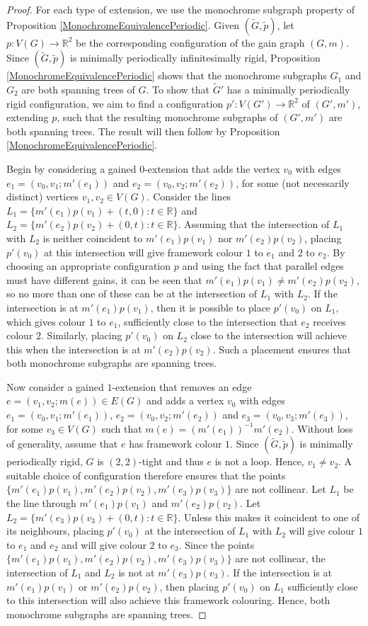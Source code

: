 \documentclass[reqno,a4paper,10pt]{article}
\theoremstyle{definition}
\theoremstyle{remark}
\numberwithin{equation}{section}
\numberwithin{figure}{section}
\numberwithin{table}{section}
\newcommand{\R}{\mathbb{R}}
\newcommand{\G}{\tilde{G}}
\newcommand{\p}{\tilde{p}}
\begin{document}
	\begin{proof}
        For each type of extension, we use the monochrome subgraph property of Proposition \ref{MonochromeEquivalencePeriodic}. Given $(\G,\p)$, let $p:V(G)\to\R^2$ be the corresponding configuration of the gain graph $(G,m)$. Since $(\G,\p)$ is minimally periodically infinitesimally rigid, Proposition \ref{MonochromeEquivalencePeriodic} shows that the monochrome subgraphs $G_1$ and $G_2$ are both spanning trees of $G$. To show that $\G'$ has a minimally periodically rigid configuration, we aim to find a configuration $p':V(G')\to\R^2$ of $(G',m')$, extending $p$, such that the resulting monochrome subgraphs of $(G',m')$ are both spanning trees. The result will then follow by Proposition \ref{MonochromeEquivalencePeriodic}.
    
		Begin by considering a gained $0$-extension that adds the vertex $v_0$ with edges $e_1=(v_0,v_1;m'(e_1))$ and $e_2=(v_0,v_2;m'(e_2))$, for some (not necessarily distinct) vertices $v_1,v_2\in V(G)$. Consider the lines $L_1=\{m'(e_1)p(v_1)+(t,0):t\in\R\}$ and $L_2=\{m'(e_2)p(v_2)+(0,t):t\in\R\}$. Assuming that the intersection of $L_1$ with $L_2$ is neither coincident to $m'(e_1)p(v_1)$ nor $m'(e_2)p(v_2)$, placing $p'(v_0)$ at this intersection will give framework colour $1$ to $e_1$ and $2$ to $e_2$. By choosing an appropriate configuration $p$ and using the fact that parallel edges must have different gains, it can be seen that $m'(e_1)p(v_1)\neq m'(e_2)p(v_2)$, so no more than one of these can be at the intersection of $L_1$ with $L_2$. If the intersection is at $m'(e_1)p(v_1)$, then it is possible to place $p'(v_0)$ on $L_1$, which gives colour $1$ to $e_1$, sufficiently close to the intersection that $e_2$ receives colour $2$. Similarly, placing $p'(v_0)$ on $L_2$ close to the intersection will achieve this when the intersection is at $m'(e_2)p(v_2)$. Such a placement ensures that both monochrome subgraphs are spanning trees.
		
		Now consider a gained $1$-extension that removes an edge $e=(v_1,v_2;m(e))\in E(G)$ and adds a vertex $v_0$ with edges $e_1=(v_0,v_1;m'(e_1))$, $e_2=(v_0,v_2;m'(e_2))$ and $e_3=(v_0,v_3;m'(e_3))$, for some $v_3\in V(G)$ such that $m(e)=(m'(e_1))^{-1}m'(e_2)$. Without loss of generality, assume that $e$ has framework colour $1$. Since $(\G,\p)$ is minimally periodically rigid, $G$ is $(2,2)$-tight and thus $e$ is not a loop. Hence, $v_1\neq v_2$. A suitable choice of configuration therefore ensures that the points $\{m'(e_1)p(v_1),m'(e_2)p(v_2),m'(e_3)p(v_3)\}$ are not collinear. Let $L_1$ be the line through $m'(e_1)p(v_1)$ and $m'(e_2)p(v_2)$. Let $L_2=\{m'(e_3)p(v_3)+(0,t):t\in\R\}$. Unless this makes it coincident to one of its neighbours, placing $p'(v_0)$ at the intersection of $L_1$ with $L_2$ will give colour $1$ to $e_1$ and $e_2$ and will give colour $2$ to $e_3$. Since the points $\{m'(e_1)p(v_1),m'(e_2)p(v_2),m'(e_3)p(v_3)\}$ are not collinear, the intersection of $L_1$ and $L_2$ is not at $m'(e_3)p(v_3)$. If the intersection is at $m'(e_1)p(v_1)$ or $m'(e_2)p(v_2)$, then placing $p'(v_0)$ on $L_1$ sufficiently close to this intersection will also achieve this framework colouring. Hence, both monochrome subgraphs are spanning trees.
		

\end{proof}
\end{document}
